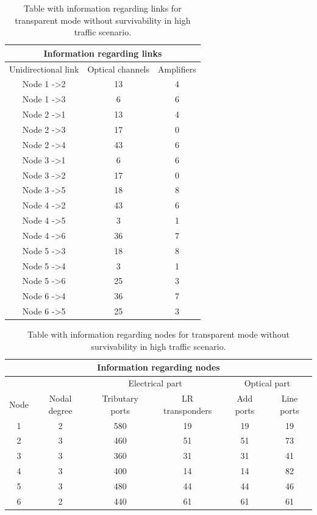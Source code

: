 \begin{table}[H]
	\centering
	\begin{tabular}{|c|c|c|}
		\hline
		\multicolumn{3}{|c|}{\textbf{Information regarding links}} \\ \hline
		Unidirectional link & Optical channels & Amplifiers \\ \hline
		Node 1 -\textgreater 2 & 13 & 4 \\ \hline
		Node 1 -\textgreater 3 & 6 & 6 \\ \hline
		Node 2 -\textgreater 1 & 13 & 4 \\ \hline
		Node 2 -\textgreater 3 & 17 & 0 \\ \hline
		Node 2 -\textgreater 4 & 43 & 6 \\ \hline
		Node 3 -\textgreater 1 & 6 & 6 \\ \hline
		Node 3 -\textgreater 2 & 17 & 0 \\ \hline
		Node 3 -\textgreater 5 & 18 & 8 \\ \hline
		Node 4 -\textgreater 2 & 43 & 6 \\ \hline
		Node 4 -\textgreater 5 & 3 & 1 \\ \hline
		Node 4 -\textgreater 6 & 36 & 7 \\ \hline
		Node 5 -\textgreater 3 & 18 & 8 \\ \hline
		Node 5 -\textgreater 4 & 3 & 1 \\ \hline
		Node 5 -\textgreater 6 & 25 & 3 \\ \hline
		Node 6 -\textgreater 4 & 36 & 7 \\ \hline
		Node 6 -\textgreater 5 & 25 & 3 \\ \hline
	\end{tabular}
	\caption{Table with information regarding links for transparent mode without survivability in high traffic scenario.}
\end{table}


\begin{table}[H]
	\centering
	\begin{tabular}{|c|c|c|c|c|c|}
		\hline
		\multicolumn{6}{|c|}{\textbf{Information regarding nodes}} \\ \hline
		\multicolumn{2}{|c|}{} & \multicolumn{2}{c|}{Electrical part} & \multicolumn{2}{c|}{Optical part} \\ \hline
		Node & Nodal degree & Tributary ports & LR transponders & Add ports & Line ports \\ \hline
		1 & 2 & 580 & 19 & 19 & 19 \\ \hline
		2 & 3 & 460 & 51 & 51 & 73 \\ \hline
		3 & 3 & 360 & 31 & 31 & 41 \\ \hline
		4 & 3 & 400 & 14 & 14 & 82 \\ \hline
		5 & 3 & 480 & 44 & 44 & 46 \\ \hline
		6 & 2 & 440 & 61 & 61 & 61 \\ \hline
	\end{tabular}
	\caption{Table with information regarding nodes for transparent mode without survivability in high traffic scenario.}
\end{table}

